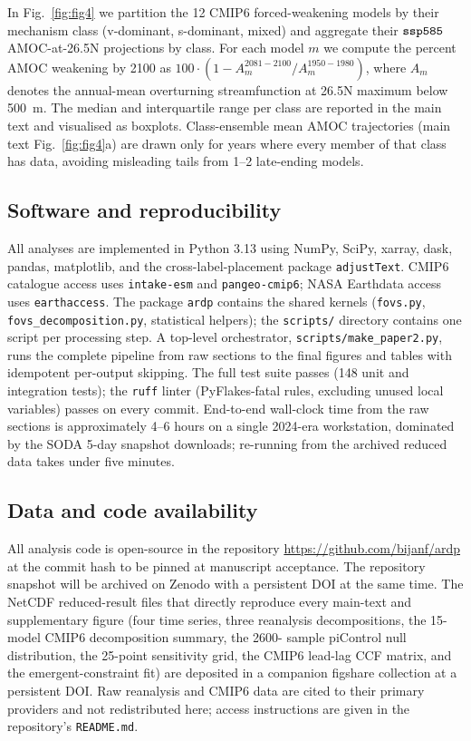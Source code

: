 \documentclass[12pt,a4paper]{article}
\begin{document}
In Fig.~\ref{fig:fig4} we partition the 12 CMIP6 forced-weakening
models by their mechanism class (v-dominant, s-dominant, mixed) and
aggregate their $\text{\texttt{ssp585}}$ AMOC-at-26.5\textdegree N
projections by class. For each model $m$ we compute the percent
AMOC weakening by 2100 as $100\cdot (1 - A_m^{2081-2100} /
A_m^{1950-1980})$, where $A_m$ denotes the annual-mean overturning
streamfunction at 26.5\textdegree N maximum below 500~m. The median
and interquartile range per class are reported in the main text and
visualised as boxplots. Class-ensemble mean AMOC trajectories (main
text Fig.~\ref{fig:fig4}a) are drawn only for years where every
member of that class has data, avoiding misleading tails from 1--2
late-ending models.

\subsection*{Software and reproducibility}

All analyses are implemented in Python 3.13 using NumPy, SciPy,
xarray, dask, pandas, matplotlib, and the cross-label-placement
package \texttt{adjustText}. CMIP6 catalogue access uses
\texttt{intake-esm} and \texttt{pangeo-cmip6}; NASA Earthdata access
uses \texttt{earthaccess}. The package \texttt{ardp} contains the
shared kernels (\texttt{fovs.py}, \texttt{fovs\_decomposition.py},
statistical helpers); the \texttt{scripts/} directory contains one
script per processing step. A top-level orchestrator,
\texttt{scripts/make\_paper2.py}, runs the complete pipeline from raw
sections to the final figures and tables with idempotent
per-output skipping. The full test suite passes (148 unit and
integration tests); the \texttt{ruff} linter (PyFlakes-fatal rules,
excluding unused local variables) passes on every commit. End-to-end
wall-clock time from the raw sections is approximately 4--6 hours on
a single 2024-era workstation, dominated by the SODA 5-day snapshot
downloads; re-running from the archived reduced data takes under five
minutes.

\subsection*{Data and code availability}

All analysis code is open-source in the repository
\url{https://github.com/bijanf/ardp} at the commit hash to be pinned
at manuscript acceptance. The repository snapshot will be archived
on Zenodo with a persistent DOI at the same time. The NetCDF
reduced-result files that directly reproduce every main-text and
supplementary figure (four time series, three reanalysis
decompositions, the 15-model CMIP6 decomposition summary, the 2600-%
sample piControl null distribution, the 25-point sensitivity grid,
the CMIP6 lead-lag CCF matrix, and the emergent-constraint fit) are
deposited in a companion figshare collection at a persistent DOI.
Raw reanalysis and CMIP6 data are cited to their primary providers
and not redistributed here; access instructions are given in the
repository's \texttt{README.md}.
\end{document}
